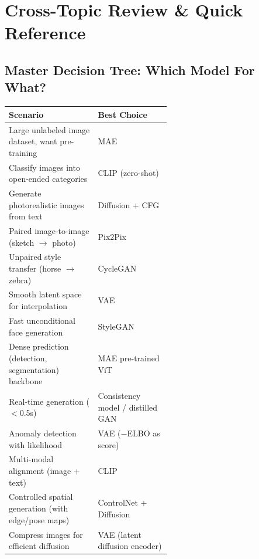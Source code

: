 \section{Cross-Topic Review \& Quick Reference}

\subsection{Master Decision Tree: Which Model For What?}

\begin{center}\small
\begin{tabular}{p{0.55\linewidth}l}\toprule
\textbf{Scenario} & \textbf{Best Choice} \\\midrule
Large unlabeled image dataset, want pre-training & MAE \\
Classify images into open-ended categories & CLIP (zero-shot) \\
Generate photorealistic images from text & Diffusion + CFG \\
Paired image-to-image (sketch $\to$ photo) & Pix2Pix \\
Unpaired style transfer (horse $\to$ zebra) & CycleGAN \\
Smooth latent space for interpolation & VAE \\
Fast unconditional face generation & StyleGAN \\
Dense prediction (detection, segmentation) backbone & MAE pre-trained ViT \\
Real-time generation ($<$0.5s) & Consistency model / distilled GAN \\
Anomaly detection with likelihood & VAE ($-$ELBO as score) \\
Multi-modal alignment (image + text) & CLIP \\
Controlled spatial generation (with edge/pose maps) & ControlNet + Diffusion \\
Compress images for efficient diffusion & VAE (latent diffusion encoder) \\
\bottomrule
\end{tabular}
\end{center}

